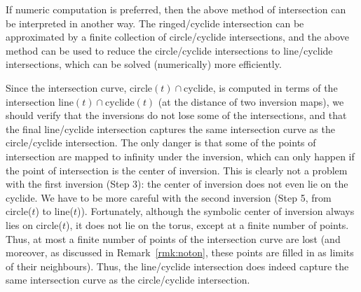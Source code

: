 \begin{rmk}
If numeric computation is preferred,
then the above method of intersection can be interpreted in another way.
The ringed/cyclide intersection can be approximated by a finite collection
of circle/cyclide intersections, and
the above method can be used to reduce the circle/cyclide intersections
to line/cyclide intersections, which can be solved (numerically)
more efficiently.
\end{rmk}

\begin{rmk}
Since the intersection curve, $\mbox{circle}(t) \cap \mbox{cyclide}$, 
is computed 
in terms of the intersection $\mbox{line}(t) \cap \mbox{cyclide}(t)$
(at the distance of two inversion maps), we should verify that 
the inversions do not lose some of the intersections,
and that the final line/cyclide intersection
captures the same intersection curve as the circle/cyclide intersection.
The only danger is that some of the points of intersection are mapped
to infinity under the inversion, which can only happen if the 
point of intersection is the center of inversion.  %
This is clearly not a problem with the first inversion (Step 3):
the center of inversion does not even lie on the cyclide.
We have to be more careful with the second inversion 
(Step 5, from circle($t$) to line($t$)).
Fortunately, although the symbolic center of inversion
always lies on circle($t$), it does not lie on the torus, 
except at a finite number of points. %
Thus, at most a finite number of points
of the intersection curve are lost (and moreover, as discussed in 
Remark~\ref{rmk:noton}, these points are filled in as limits 
of their neighbours).
Thus, the line/cyclide intersection does indeed capture the same intersection
curve as the circle/cyclide intersection.  


\end{rmk}
